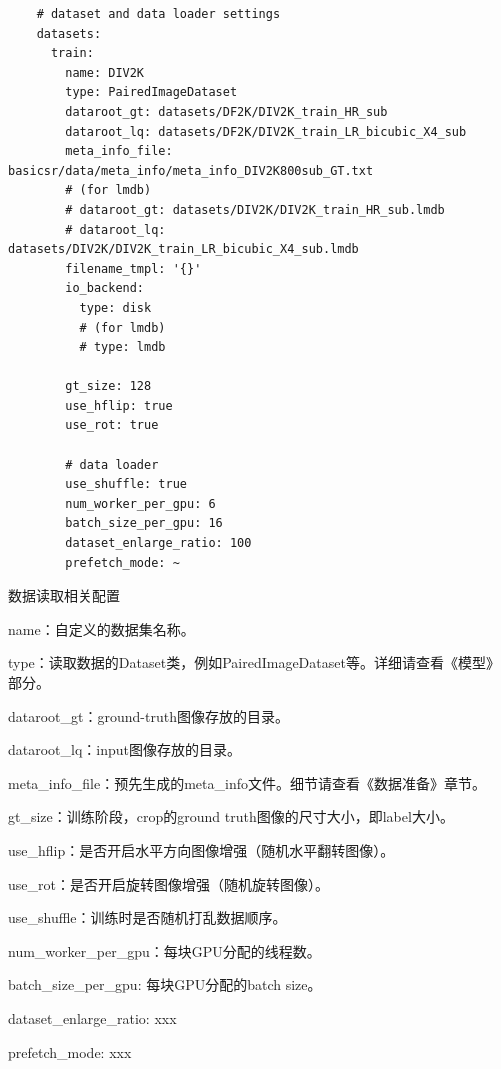 \documentclass[../main.tex]{subfiles}
\begin{document}
	\begin{verbatim}
    # dataset and data loader settings
    datasets:
      train:
        name: DIV2K
        type: PairedImageDataset
        dataroot_gt: datasets/DF2K/DIV2K_train_HR_sub
        dataroot_lq: datasets/DF2K/DIV2K_train_LR_bicubic_X4_sub
        meta_info_file: basicsr/data/meta_info/meta_info_DIV2K800sub_GT.txt
        # (for lmdb)
        # dataroot_gt: datasets/DIV2K/DIV2K_train_HR_sub.lmdb
        # dataroot_lq: datasets/DIV2K/DIV2K_train_LR_bicubic_X4_sub.lmdb
        filename_tmpl: '{}'
        io_backend:
          type: disk
          # (for lmdb)
          # type: lmdb
        
        gt_size: 128
        use_hflip: true
        use_rot: true
    
        # data loader
        use_shuffle: true
        num_worker_per_gpu: 6
        batch_size_per_gpu: 16
        dataset_enlarge_ratio: 100
        prefetch_mode: ~
	\end{verbatim}
	\begin{exampleBox}[righthand ratio=0.00, sidebyside, sidebyside align=center, lower separated=false]{数据读取相关配置}
	
	name：自定义的数据集名称。
	
	type：读取数据的Dataset类，例如PairedImageDataset等。详细请查看《模型》部分。
	
	dataroot\_gt：ground-truth图像存放的目录。
	
	dataroot\_lq：input图像存放的目录。
	
	meta\_info\_file：预先生成的meta\_info文件。细节请查看《数据准备》章节。
	
	gt\_size：训练阶段，crop的ground truth图像的尺寸大小，即label大小。
	
	use\_hflip：是否开启水平方向图像增强（随机水平翻转图像）。
	
	use\_rot：是否开启旋转图像增强（随机旋转图像）。
	
	use\_shuffle：训练时是否随机打乱数据顺序。
	
	num\_worker\_per\_gpu：每块GPU分配的线程数。
	
	batch\_size\_per\_gpu: 每块GPU分配的batch size。
	
	dataset\_enlarge\_ratio: xxx
    
    prefetch\_mode: xxx
    
    \end{exampleBox}
    
\end{document}
